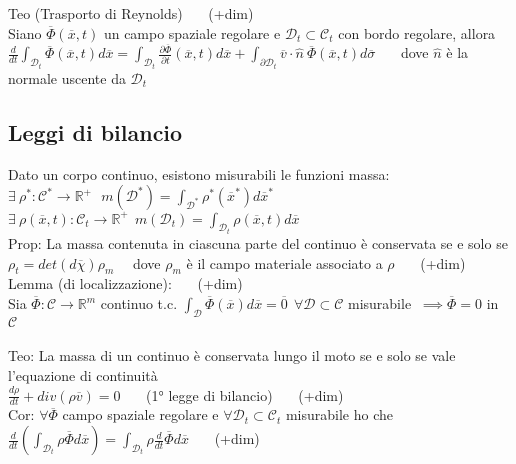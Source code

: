 \documentclass{article}
\theoremstyle{unnumbered}
\theoremstyle{unnumbered1}
\begin{document}
%
%
%
Teo (Trasporto di Reynolds) \ \ \ (+dim)\\
Siano $\overline{\Phi}(\overline{x},t)$ un campo spaziale regolare e $\mathcal{D}_t\subset\mathcal{C}_t$ con bordo regolare, allora \\ $\frac{d}{dt}\int_{\mathcal{D}_t}\overline{\Phi}(\overline{x},t)d\overline{x} = \int_{\mathcal{D}_t}\frac{\partial \overline{\Phi}}{\partial t}(\overline{x},t)d\overline{x} + \int_{\partial \mathcal{D}_t}\overline{v}\cdot\hat{n} \ \overline{\Phi}(\overline{x},t)d\overline{\sigma}$ \ \ \ dove $\hat{n}$ è la normale uscente da $\mathcal{D}_t$



\subsection{Leggi di bilancio}
%
Dato un corpo continuo, esistono misurabili le funzioni massa:\\
%
$\exists\ \rho^*: \mathcal{C}^*\rightarrow  \mathbb{R}^+ \ \ \ m(\mathcal{D}^*)=\int_{\mathcal{D}^*}\rho^*(\overline{x}^*)d\overline{x}^* $\\
$\exists\ \rho(\overline{x},t):\mathcal{C}_t\rightarrow\mathbb{R}^+ \ \ m(\mathcal{D}_t)= \int_{\mathcal{D}_t}\rho(\overline{x},t)d\overline{x} $ \\
%
Prop: La massa contenuta in ciascuna parte del continuo è conservata se e solo se\\
\phantom{Prop: }$\rho_t=det(d\overline{\chi})\rho_m$ \ \  dove $\rho_m$ è il campo materiale associato a $\rho$ \ \ \ (+dim)\\
%
Lemma (di localizzazione): \ \ \ (+dim)\\
Sia $\overline{\Phi}:\mathcal{C}\rightarrow\mathbb{R}^m$ continuo t.c. $\int_{\mathcal{D}}\overline{\Phi}(\overline{x})d\overline{x}=\overline{0} \ \ \forall \mathcal{D}\subset \mathcal{C}$ misurabile $\ \implies \overline{\Phi}=0$ in $\mathcal{C}$ \\ \\
%
%
%
Teo: La massa di un continuo è conservata lungo il moto se e solo se vale l'equazione di continuità  \\
\phantom{Teo: }$\frac{d\rho}{dt} + div(\rho\overline{v})=0$ \ \ \ (1° legge di bilancio) \ \ \ (+dim)\\
%
%
%
Cor: $\forall \overline{\Phi}$ campo spaziale regolare e $\forall \mathcal{D}_t\subset\mathcal{C}_t$ misurabile ho che $\frac{d}{dt}(\int_{\mathcal{D}_t}\rho\overline{\Phi}d\overline{x})=\int_{\mathcal{D}_t}\rho\frac{d}{dt}\overline{\Phi}d\overline{x}$ \ \ \ (+dim)\\
\end{document}
